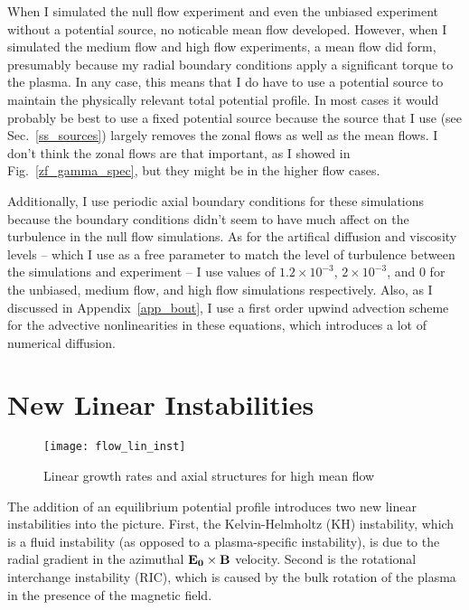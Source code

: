 When I simulated the null flow experiment and even the unbiased experiment without a potential source, no noticable mean flow developed. 
However, when I simulated the medium flow and high flow experiments, a mean
flow did form, presumably because my radial boundary conditions apply a significant torque to the plasma. In any case, this means that I do have to use a potential source to maintain
the physically relevant total potential profile. In most cases it would probably be best to use a fixed potential source because the source that I use (see Sec.~\ref{ss_sources})
largely removes the zonal flows as well as the mean flows. I don't think the zonal flows are that important, as I showed in Fig.~\ref{zf_gamma_spec}, but they might be in the higher flow
cases.

Additionally, I use periodic axial boundary conditions for these simulations because the boundary conditions didn't seem to have much affect on the turbulence in the null flow simulations.
As for the artifical diffusion and viscosity levels -- which I use as a free parameter to match the level of turbulence between the simulations and experiment -- I use values of
$1.2 \times 10^{-3}$, $2 \times 10^{-3}$, and $0$ for the unbiased, medium flow, and high flow simulations respectively. Also, as I discussed in Appendix~\ref{app_bout}, I use a first order
upwind advection scheme for the advective nonlinearities in these equations, which introduces a lot of numerical diffusion.


\section{New Linear Instabilities}
\label{s_flow_inst}

\begin{figure}
\centerline{\texttt{[image: flow\_lin\_inst]}}
\caption{Linear growth rates and axial structures for high mean flow}
\label{flow_lin_inst}
\end{figure}


The addition of an equilibrium potential profile introduces two new linear instabilities into the picture. First, the Kelvin-Helmholtz (KH) instability, which is a fluid instability (as opposed to
a plasma-specific instability), is due to the radial gradient in the azimuthal ${\bf E_0 \times B}$ velocity. Second is the rotational interchange instability (RIC), which is caused by the bulk
rotation of the plasma in the presence of the magnetic field.

